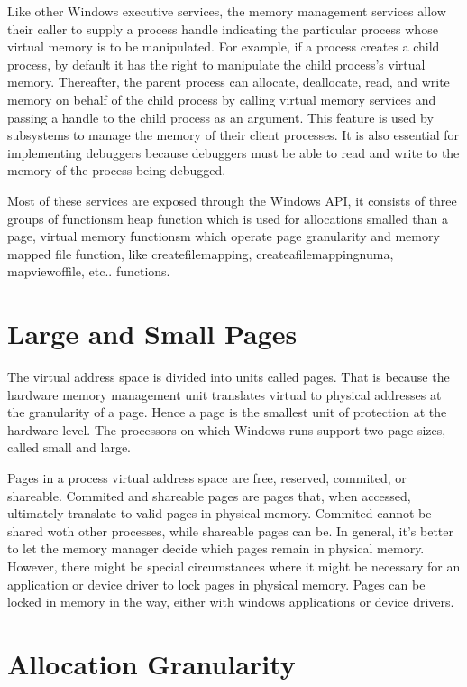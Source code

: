 \documentclass[letterpaper,10pt,draftclsnofoot,onecolumn]{IEEEtran}
\begin{document}
Like other Windows executive services, the memory management services allow their caller to
supply a process handle indicating the particular process whose virtual memory is to be manipulated. For example, if a process creates a child process, by default it has the right to manipulate the child process’s virtual memory. Thereafter, the parent process can allocate, deallocate, read, and write memory on behalf of the child process by calling virtual memory services and passing a handle to the child process as an argument. This feature is used by subsystems to manage the memory of their client processes. It is also essential for implementing debuggers because debuggers must be able to read and write to the memory of the process being debugged.

Most of these services are exposed through the Windows API, it consists of three groups of functionsm heap function which is used for allocations smalled than a page, virtual memory functionsm which operate page granularity and memory mapped file function, like createfilemapping, createafilemappingnuma, mapviewoffile, etc.. functions.

\section*{Large and Small Pages}

The virtual address space is divided into units called pages. That is because the hardware memory management unit translates virtual to physical addresses at the granularity of a page. Hence a page is the smallest unit of protection at the hardware level. The processors on which Windows runs support two page sizes, called small and large. 

Pages in a process virtual address space are free, reserved, commited, or shareable. Commited and shareable pages are pages that, when accessed, ultimately translate to valid pages in physical memory. Commited cannot be shared woth other processes, while shareable pages can be. In general, it’s better to let the memory manager decide which pages remain in physical memory. However, there might be special circumstances where it might be necessary for an application or device driver to lock pages in physical memory. Pages can be locked in memory in the way, either with windows applications or device drivers.

\section*{Allocation Granularity}
\end{document}
